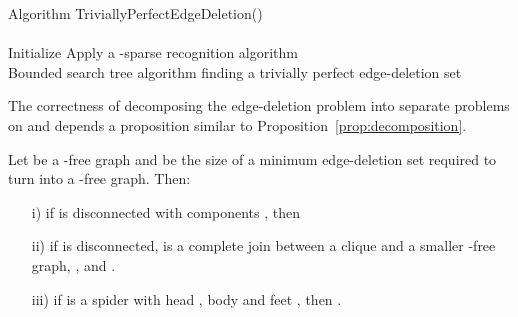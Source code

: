 \documentclass{llncs}
\begin{document}
\begin{algorithm}[H]
\SetAlgoLined Algorithm {\sc TriviallyPerfectEdgeDeletion()}\\
\ \\
Initialize \;
Apply a -sparse recognition algorithm\;
\ \\
\caption{Bounded search tree algorithm finding a trivially perfect edge-deletion set}
\label{alg:TrivPer}
\end{algorithm}

The correctness of decomposing the edge-deletion problem into separate problems on  and  depends a proposition similar to Proposition~\ref{prop:decomposition}.

\begin{proposition}\label{prop:trivperdecomp}
 Let  be a -free graph and  be the size of a minimum edge-deletion set required to turn  into a -free graph. Then:
 \begin{itemize}
 \item[i)] if  is disconnected with components , then 
 \item[ii)] if  is disconnected,  is a complete join between a clique and a smaller -free graph, , and .
 \item[iii)] if  is a spider with head , body  and feet , then .
 \end{itemize}
\end{proposition}
\end{document}
